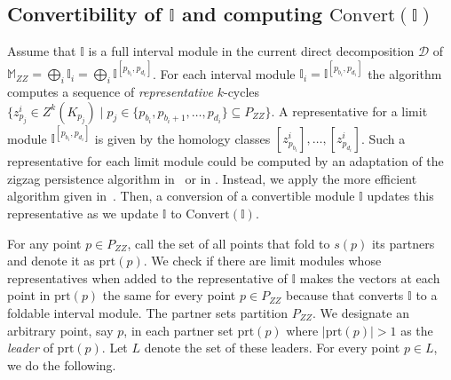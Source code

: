 \documentclass[11pt]{article}
\theoremstyle{plain}%
\newcommand{\Int}{\mathbb{I}}
\newcommand{\prt}{\mathrm{prt}}
\newcommand{\M}{\mathbb{M}}
\newcommand{\D}{\mathcal{D}}
\newcommand{\ZZ}{\mathsf{Z}}
\newcommand{\Fld}{\mathrm{Fld}}
\begin{document}
\subsection{Convertibility of $\Int$ and computing $\mathrm{Convert}(\Int)$}
\label{sec:convert}
Assume that $\Int$ is a full interval module in the current direct decomposition $\D$ of $\M_{ZZ}=\bigoplus_i \Int_i=\bigoplus_i \Int^{[p_{b_i},p_{d_i}]}$.
For each interval module $\Int_i=\Int^{[p_{b_i},p_{d_i}]}$ the algorithm computes a sequence of
\emph{representative} $k$-cycles $\{z^i_{p_j}\in Z^k(K_{p_j}) \mid p_j\in \{p_{b_i},p_{b_i+1},\ldots, p_{d_i}\}\subseteq P_{ZZ}\}$.
A representative
for a limit module $\Int^{[p_{b_i},p_{d_i}]}$ 
is given by the homology classes
$[z^i_{p_{b_i}}],\ldots, [z^i_{p_{d_i}}]$. Such a representative
for each limit module could be computed
by an adaptation of the zigzag persistence algorithm in~\cite{maria2014zigzag} or in \cite[Chapter 4,section 4.3]{DW22}. Instead, we apply the more efficient algorithm 
given in~\cite{DHM25}.
Then, a conversion of a convertible
module $\Int$ updates this representative as we update $\Int$ to $\mathrm{Convert}(\Int)$.


For any point $p\in P_{ZZ}$, call the set of all points that fold to $s(p)$ its partners and denote it as $\prt(p)$. We check if there are limit modules whose representatives when added
to the representative of $\Int$ makes the vectors at each point in $\prt(p)$ the same for every point $p\in P_{ZZ}$ because that converts $\Int$ to a foldable interval module. The partner sets partition $P_{ZZ}$. We designate an arbitrary point, say $p$, in each partner set $\prt(p)$ where $|\prt(p)|>1$ as the \emph{leader} of $\prt(p)$. Let
$L$ denote the set of these leaders. For every point $p\in L$,
we do the following.
\end{document}
